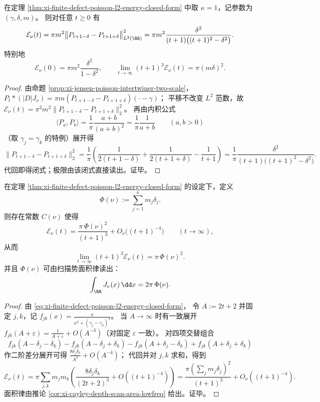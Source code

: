 \begin{corollary}\label{cor:xi-finite-defect-poisson-l2-energy-single-defect}
在定理 \ref{thm:xi-finite-defect-poisson-l2-energy-closed-form} 中取 \(\kappa=1\)，记参数为 \((\gamma,\delta,m)\)。
则对任意 \(t\ge 0\) 有
\[
\mathcal E_\nu(t)
=\pi m^2\bigl\|P_{t+1-\delta}-P_{t+1+\delta}\bigr\|_{L^2(\RR)}^2
=\pi m^2\frac{\delta^2}{(t+1)\bigl((t+1)^2-\delta^2\bigr)}.
\]
特别地
\[
\mathcal E_\nu(0)=\pi m^2\frac{\delta^2}{1-\delta^2},
\qquad
\lim_{t\to\infty}(t+1)^3\mathcal E_\nu(t)=\pi(m\delta)^2.
\]
\end{corollary}
\begin{proof}
由命题 \ref{prop:xi-jensen-poisson-intertwiner-two-scale}，
\(
P_t*(|D|J_\nu)=\pi m(P_{t+1-\delta}-P_{t+1+\delta})(\cdot-\gamma)
\)；
平移不改变 \(L^2\) 范数，故
\(\mathcal E_\nu(t)=\pi^2m^2\|P_{t+1-\delta}-P_{t+1+\delta}\|_2^2\)。
再由内积公式
\[
\langle P_a,P_b\rangle=\frac{1}{\pi}\frac{a+b}{(a+b)^2}
=\frac{1}{\pi}\frac{1}{a+b}\qquad(a,b>0)
\]
（取 \(\gamma_j=\gamma_k\) 的特例）展开得
\[
\|P_{t+1-\delta}-P_{t+1+\delta}\|_2^2
=\frac{1}{\pi}\left(\frac{1}{2(t+1-\delta)}+\frac{1}{2(t+1+\delta)}-\frac{1}{t+1}\right)
=\frac{1}{\pi}\frac{\delta^2}{(t+1)\bigl((t+1)^2-\delta^2\bigr)}.
\]
代回即得闭式；极限由该闭式直接读出。证毕。
\end{proof}

\begin{corollary}[能尾的加权总偏移质量]\label{cor:xi-finite-defect-poisson-l2-energy-tail-mass}
在定理 \ref{thm:xi-finite-defect-poisson-l2-energy-closed-form} 的设定下，定义
\[
\Phi(\nu):=\sum_{j=1}^{\kappa}m_j\delta_j.
\]
则存在常数 \(C(\nu)\) 使得
\[
\mathcal E_\nu(t)=\frac{\pi\,\Phi(\nu)^2}{(t+1)^3}+O_\nu\bigl((t+1)^{-4}\bigr)
\qquad(t\to\infty),
\]
从而
\[
\lim_{t\to\infty}(t+1)^3\mathcal E_\nu(t)=\pi\,\Phi(\nu)^2.
\]
并且 \(\Phi(\nu)\) 可由扫描势面积律读出：
\[
\int_{\RR}J_\nu(x)\,\dd x=2\pi\,\Phi(\nu).
\]
\end{corollary}
\begin{proof}
由 \eqref{eq:xi-finite-defect-poisson-l2-energy-closed-form}，
令 \(A:=2t+2\) 并固定 \(j,k\)，记
\(
f_{jk}(x)=\frac{x}{x^2+(\gamma_j-\gamma_k)^2}
\)。
当 \(A\to\infty\) 时有一致展开 \(f_{jk}(A+\varepsilon)=\frac{1}{A+\varepsilon}+O(A^{-3})\)（对固定 \(\varepsilon\) 一致）。
对四项交替组合
\[
f_{jk}(A-\delta_j-\delta_k)-f_{jk}(A-\delta_j+\delta_k)-f_{jk}(A+\delta_j-\delta_k)+f_{jk}(A+\delta_j+\delta_k)
\]
作二阶差分展开可得
\(
\frac{8\delta_j\delta_k}{A^3}+O(A^{-4})
\)；
代回并对 \(j,k\) 求和，得到
\[
\mathcal E_\nu(t)=\pi\sum_{j,k}m_jm_k\left(\frac{8\delta_j\delta_k}{(2t+2)^3}+O((t+1)^{-4})\right)
=\frac{\pi(\sum_j m_j\delta_j)^2}{(t+1)^3}+O_\nu((t+1)^{-4}).
\]
面积律由推论 \ref{cor:xi-cayley-depth-scan-area-lowfreq} 给出。证毕。
\end{proof}

